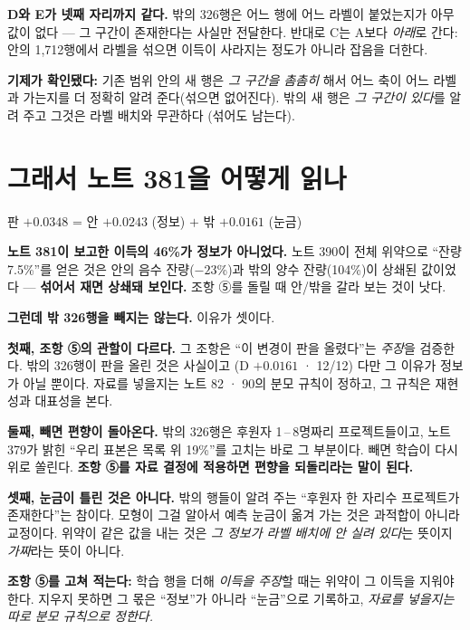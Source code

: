 \documentclass[11pt]{article}
\begin{document}
\textbf{D와 E가 넷째 자리까지 같다.} 밖의 326행은 어느 행에 어느 라벨이
붙었는지가 아무 값이 없다 --- 그 구간이 존재한다는 사실만 전달한다. 반대로
C는 A보다 \emph{아래}로 간다: 안의 1,712행에서 라벨을 섞으면 이득이
사라지는 정도가 아니라 잡음을 더한다.

\textbf{기제가 확인됐다:} 기존 범위 안의 새 행은 \emph{그 구간을 촘촘히}
해서 어느 축이 어느 라벨과 가는지를 더 정확히 알려 준다(섞으면 없어진다).
밖의 새 행은 \emph{그 구간이 있다}를 알려 주고 그것은 라벨 배치와 무관하다
(섞어도 남는다).

\section{그래서 노트 381을 어떻게 읽나}

\begin{center}
판 $+0.0348$ \; = \; 안 $+0.0243$ (정보) \; $+$ \; 밖 $+0.0161$ (눈금)
\end{center}

\textbf{노트 381이 보고한 이득의 46\%가 정보가 아니었다.} 노트 390이 전체
위약으로 ``잔량 7.5\%''를 얻은 것은 안의 음수 잔량($-23$\%)과 밖의 양수
잔량(104\%)이 상쇄된 값이었다 --- \textbf{섞어서 재면 상쇄돼 보인다.}
조항 ⑤를 돌릴 때 안/밖을 갈라 보는 것이 낫다.

\textbf{그런데 밖 326행을 빼지는 않는다.} 이유가 셋이다.

\textbf{첫째, 조항 ⑤의 관할이 다르다.} 그 조항은 ``이 변경이 판을
올렸다''는 \emph{주장}을 검증한다. 밖의 326행이 판을 올린 것은 사실이고
(D $+0.0161$ · 12/12) 다만 그 이유가 정보가 아닐 뿐이다. 자료를 넣을지는
노트 82 · 90의 분모 규칙이 정하고, 그 규칙은 재현성과 대표성을 본다.

\textbf{둘째, 빼면 편향이 돌아온다.} 밖의 326행은 후원자 1\,--\,8명짜리
프로젝트들이고, 노트 379가 밝힌 ``우리 표본은 목록 위 19\%''를 고치는
바로 그 부분이다. 빼면 학습이 다시 위로 쏠린다. \textbf{조항 ⑤를 자료
결정에 적용하면 편향을 되돌리라는 말이 된다.}

\textbf{셋째, 눈금이 틀린 것은 아니다.} 밖의 행들이 알려 주는 ``후원자
한 자리수 프로젝트가 존재한다''는 참이다. 모형이 그걸 알아서 예측 눈금이
옮겨 가는 것은 과적합이 아니라 교정이다. 위약이 같은 값을 내는 것은
\emph{그 정보가 라벨 배치에 안 실려 있다}는 뜻이지 \emph{가짜}라는 뜻이
아니다.

\textbf{조항 ⑤를 고쳐 적는다:} 학습 행을 더해 \emph{이득을 주장}할 때는
위약이 그 이득을 지워야 한다. 지우지 못하면 그 몫은 ``정보''가 아니라
``눈금''으로 기록하고, \emph{자료를 넣을지는 따로 분모 규칙으로 정한다.}
\end{document}

